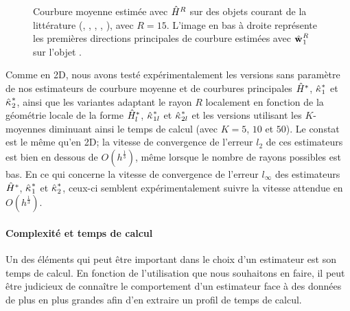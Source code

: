 \begin{figure}[ht]
{\begin{center}
  \end{center}
      }
      \caption{
      Courbure moyenne estimée avec $\hat{H}^{R}$ sur des objets courant de la
      littérature (\Bunny, \Armadillo, \Dragon, \Lucy, \AsianDragon), avec
      $R=15$. L'image en bas à droite représente les premières directions
      principales de courbure estimées avec $\hat{\mathbf{w}_{}}_{1}^{R}$ sur l'objet
      \AsianDragon.
      \label{fig:sexy-pic}}
\end{figure}


Comme en 2D, nous avons testé expérimentalement les versions sans paramètre de
nos estimateurs de courbure moyenne et de courbures principales $\hat{H}^{*}$,
$\hat{\kappa_{}}_{1}^{*}$ et $\hat{\kappa_{}}_{2}^{*}$, ainsi que les variantes adaptant le
rayon $R$ localement en fonction de la géométrie locale de la forme
$\hat{H}^{*}_{l}$, $\hat{\kappa_{}}_{1l}^{*}$ et $\hat{\kappa_{}}_{2l}^{*}$ et les versions
utilisant les $K$-moyennes diminuant ainsi le temps de calcul (avec $K = 5$,
$10$ et $50$). Le constat est le même qu'en 2D; la vitesse de convergence de
l'erreur $l_2$ de ces estimateurs est bien en dessous de $O(h^\frac{1}{3})$,
même lorsque le nombre de rayons possibles est bas. En ce qui concerne la vitesse
de convergence de l'erreur $l_\infty$ des estimateurs $\hat{H}^{*}$,
$\hat{\kappa_{}}_{1}^{*}$ et $\hat{\kappa_{}}_{2}^{*}$, ceux-ci semblent expérimentalement
suivre la vitesse attendue en $O(h^\frac{1}{3})$.

\paragraph{Complexité et temps de calcul}
\label{sec:complexite}

Un des éléments qui peut être important dans le choix d'un estimateur est son
temps de calcul. En fonction de l'utilisation que nous souhaitons en faire, il
peut être judicieux de connaître le comportement d'un estimateur face à des
données de plus en plus grandes afin d'en extraire un profil de temps de calcul.


